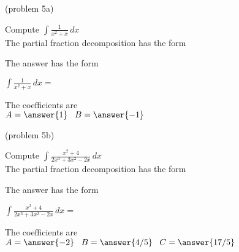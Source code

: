 \documentclass{ximera}
\begin{document}
\begin{problem}(problem 5a)

Compute $\displaystyle{\int \frac{1}{x^2 + x}\, dx}$\\

The partial fraction decomposition has the form

\begin{multipleChoice}
\end{multipleChoice}

The answer has the form

$\displaystyle{\int \frac{1}{x^2 + x} \, dx =}$

\begin{multipleChoice}
\end{multipleChoice}

The coefficients are\\
$A = \answer{1} \;\;\; B = \answer{-1} \;\;\; $

\end{problem}



\begin{problem}(problem 5b)

Compute $\displaystyle{\int \frac{x^2 + 4}{2x^3 + 3x^2 - 2x}\, dx}$\\

The partial fraction decomposition has the form

\begin{multipleChoice}
\end{multipleChoice}

The answer has the form

$\displaystyle{\int \frac{x^2 + 4}{2x^3 + 3x^2 - 2x}\, dx =}$

\begin{multipleChoice}
\end{multipleChoice}

The coefficients are\\
$A = \answer{-2} \;\;\; B = \answer{4/5} \;\;\; C = \answer{17/5} $
\end{problem}
\end{document}
